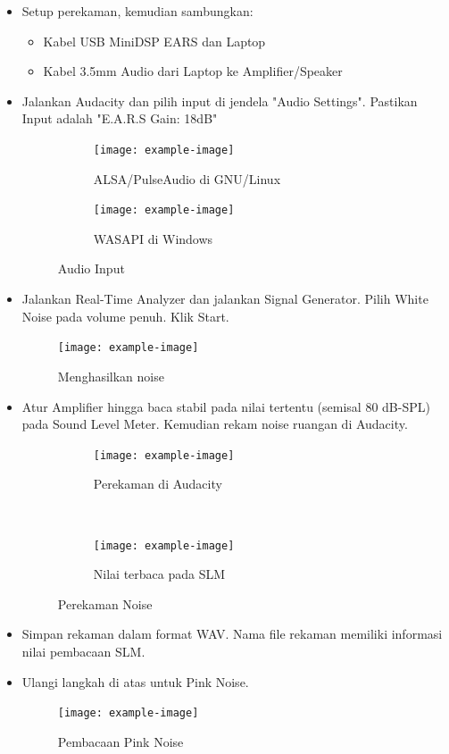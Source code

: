 \documentclass{article}
\begin{document}
	\begin{itemize}
		\item Setup perekaman, kemudian sambungkan:
		\begin{itemize}
			\item Kabel USB MiniDSP EARS dan Laptop
			\item Kabel 3.5mm Audio dari Laptop ke Amplifier/Speaker
		\end{itemize}
	
		\item Jalankan Audacity dan pilih input di jendela "Audio Settings".
		Pastikan Input adalah "E.A.R.S Gain: 18dB"
		
		\begin{figure}[H]
			\centering
			\begin{subfigure}[]{.55\textwidth}
				\texttt{[image: example-image]}
				\caption{ALSA/PulseAudio di GNU/Linux}
			\end{subfigure}
			\begin{subfigure}[]{.35\textwidth}
				\texttt{[image: example-image]}
				\caption{WASAPI di Windows}
			\end{subfigure}
			\caption{Audio Input}
		\end{figure}
		
		\item Jalankan Real-Time Analyzer dan jalankan Signal Generator.
		Pilih White Noise pada volume penuh. Klik Start.
		
		\begin{figure}[H]
			\centering
			\texttt{[image: example-image]}
			\caption{Menghasilkan noise}
		\end{figure}
	
		\item Atur Amplifier hingga baca stabil pada nilai tertentu (semisal 80 dB-SPL) pada Sound Level Meter.
		Kemudian rekam noise ruangan di Audacity.
		
		\begin{figure}[H]
			\centering
			\begin{subfigure}[]{.8\textwidth}
				\texttt{[image: example-image]}
				\caption{Perekaman di Audacity}
			\end{subfigure}
			\\
			\begin{subfigure}[]{.5\textwidth}
				\texttt{[image: example-image]}
				\caption{Nilai terbaca pada SLM}
			\end{subfigure}
			\caption{Perekaman Noise}
		\end{figure}
		
		\item Simpan rekaman dalam format WAV.
		Nama file rekaman memiliki informasi nilai pembacaan SLM.
		
		\item Ulangi langkah di atas untuk Pink Noise.
		
		\begin{figure}[H]
			\centering
			\texttt{[image: example-image]}
			\caption{Pembacaan Pink Noise}
		\end{figure}
		
	\end{itemize}
\end{document}
